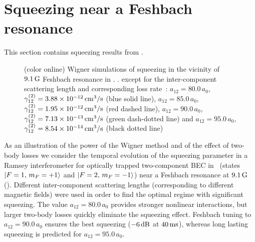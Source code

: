 \section{Squeezing near a Feshbach resonance}

This section contains squeezing results from \cite{Opanchuk2012}.


\begin{figure}

    \caption[]{(color online)
    Wigner simulations of squeezing in the vicinity of $9.1\mbox{\ensuremath{\,\mathrm{G}}}$ Feshbach resonance in \Rb.
    .
    except for the inter-component scattering length and corresponding loss rate~\cite{Kaufman2009}:
    $a_{12} = 80.0\,a_0$, $\gamma^{(2)}_{12} = 3.88 \times 10^{-12}\mbox{\ensuremath{\,\mathrm{cm^3/s}}}$ (blue solid line),
    $a_{12} = 85.0\,a_0$, $\gamma^{(2)}_{12} = 1.95 \times 10^{-12}\mbox{\ensuremath{\,\mathrm{cm^3/s}}}$ (red dashed line),
    $a_{12} = 90.0\,a_0$, $\gamma^{(2)}_{12} = 7.13 \times 10^{-13}\mbox{\ensuremath{\,\mathrm{cm^3/s}}}$ (green dash-dotted line) and
    $a_{12} = 95.0\,a_0$, $\gamma^{(2)}_{12} = 8.54 \times 10^{-14}\mbox{\ensuremath{\,\mathrm{cm^3/s}}}$ (black dotted line)}

    \label{fig:squeezing}
\end{figure}

As an illustration of the power of the Wigner method and of the effect of two-body losses we consider the temporal evolution of the squeezing parameter in a Ramsey interferometer for optically trapped two-component BEC in \Rb\ (states ${\mbox{\ensuremath{\vert F=1,\, m_F=+1 \rangle}}}$ and ${\mbox{\ensuremath{\vert F=2,\, m_F=-1 \rangle}}}$) near a Feshbach resonance at $9.1\mbox{\ensuremath{\,\mathrm{G}}}$ ().
Different inter-component scattering lengths (corresponding to different magnetic fields)
were used in order to find the optimal regime with significant squeezing.
The value $a_{12} = 80.0\,a_0$ provides stronger nonlinear interactions, but larger two-body losses quickly eliminate the squeezing effect.
Feshbach tuning to $a_{12} = 90.0\,a_0$ ensures the best squeezing ($-6\mbox{\ensuremath{\,\mathrm{dB}}}$ at $40\mbox{\ensuremath{\,\mathrm{ms}}}$), whereas long lasting squeezing is predicted for $a_{12} = 95.0\,a_0$.

